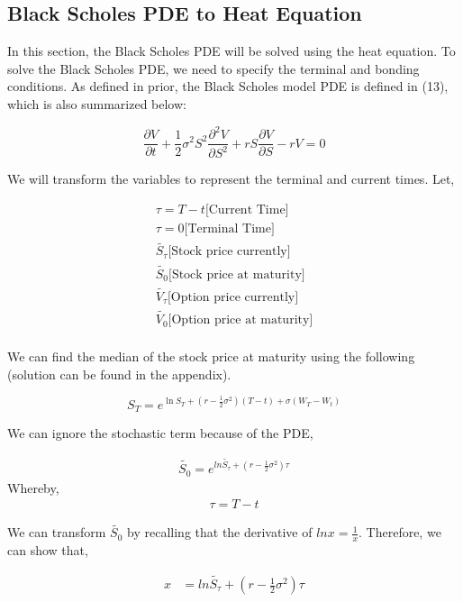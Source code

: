 \documentclass[12pt]{article}
\begin{document}
\subsection{Black Scholes PDE to Heat Equation}
In this section, the Black Scholes PDE will be solved using the heat equation. To solve the Black Scholes PDE, we need to specify the terminal and bonding conditions. As defined in prior, the Black Scholes model PDE is defined in (13), which is also summarized below:

\begin{equation}
\frac{\partial V}{\partial t} + \frac{1}{2}\sigma^2 S^2 \frac{\partial ^2 V}{\partial S^2} + rS \frac{\partial V}{\partial S} - rV = 0
\end{equation}

We will transform the variables to represent the terminal and current times. Let,

\begin{align*}
\tau = T - t \text{[Current Time]}\\
\tau = 0 \text{[Terminal Time]}\\
\tilde{S_{\tau}} \text{[Stock price currently]}\\
\tilde{S_{0}}\text{[Stock price at maturity]}\\
\tilde{V_{\tau}} \text{[Option price currently]} \\
\tilde{V_{0}} \text{[Option price at maturity]}\\
\end{align*}

We can find the median of the stock price at maturity using the following (solution can be found in the appendix).

\begin{equation}
S_{T} = e^{\ln{S_{T}} + (r - \frac{1}{2}\sigma ^2)(T-t) + \sigma(W_{T} - W_{t})}
\end{equation}

We can ignore the stochastic term because of the PDE,

\begin{align*}
\tilde{S_{0}} = e^{ln{\tilde{S_{\tau}}} + (r-\frac{1}{2}\sigma ^2)\tau}
\end{align*}
Whereby,
\begin{align*}
\tau = T- t
\end{align*}

We can transform $\tilde{S_{0}}$ by recalling that the derivative of $ln{x} = \frac{1}{x}$. Therefore, we can show that,

\begin{align*}
x &= ln{\tilde{S_{\tau}}} + (r-\frac{1}{2}\sigma ^2)\tau
\end{align*}
\end{document}
